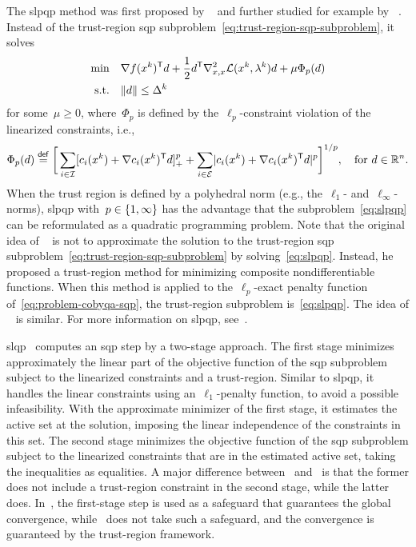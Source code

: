 The \gls{slpqp} method was first proposed by \citeauthor{Fletcher_1982a}~\cite{Fletcher_1982a} and further studied for example by \citeauthor{Yuan_1995}~\cite{Yuan_1995}.
Instead of the trust-region \gls{sqp} subproblem~\cref{eq:trust-region-sqp-subproblem}, it solves
\begin{subequations}
    \label{eq:slpqp}
    \begin{align}
        \min        & \quad \nabla \obj(\iter[k])^{\T} \step + \frac{1}{2} \step^{\T} \nabla_{x, x}^2 \lag(\iter[k], \lm[k]) \step + \mu \Phi_p(d)\\
        \text{s.t.} & \quad \norm{d} \le \rad[k]
    \end{align}
\end{subequations}
for some~$\mu \ge 0$, where~$\Phi_p$ is defined by the~$\ell_p$-constraint violation of the linearized constraints, i.e.,
\begin{equation*}
    \Phi_p(d) \eqdef \bigg[ \sum_{i \in \iub} \posp{\con{i}(\iter[k]) + \nabla \con{i}(\iter[k])^{\T} \step}^p + \sum_{i \in \ieq} \abs{\con{i}(\iter[k]) + \nabla \con{i}(\iter[k])^{\T} \step}^p \bigg]^{1/p}, \quad \text{for~$d \in \R^n$.}
\end{equation*}
When the trust region is defined by a polyhedral norm (e.g., the~$\ell_1$- and~$\ell_{\infty}$-norms), \gls{slpqp} with~$p \in \{1, \infty\}$ has the advantage that the subproblem~\cref{eq:slpqp} can be reformulated as a quadratic programming problem.
Note that the original idea of \citeauthor{Fletcher_1982a}~\cite{Fletcher_1982a} is not to approximate the solution to the trust-region \gls{sqp} subproblem~\cref{eq:trust-region-sqp-subproblem} by solving~\cref{eq:slpqp}.
Instead, he proposed a trust-region method for minimizing composite nondifferentiable functions.
When this method is applied to the~$\ell_p$-exact penalty function of~\cref{eq:problem-cobyqa-sqp}, the trust-region subproblem is~\cref{eq:slpqp}.
The idea of \citeauthor{Yuan_1995}~\cite{Yuan_1995} is similar.
For more information on \gls{slpqp}, see~\cite[\S~8.4.1]{Gould_2021}.

\Gls{slqp}~\cite{Fletcher_Maza_1989,Byrd_Etal_2004} computes an \gls{sqp} step by a two-stage approach.
The first stage minimizes approximately the linear part of the objective function of the \gls{sqp} subproblem subject to the linearized constraints and a trust-region.
Similar to \gls{slpqp}, it handles the linear constraints using an~$\ell_1$-penalty function, to avoid a possible infeasibility.
With the approximate minimizer of the first stage, it estimates the active set at the solution, imposing the linear independence of the constraints in this set.
The second stage minimizes the objective function of the \gls{sqp} subproblem subject to the linearized constraints that are in the estimated active set, taking the inequalities as equalities.
A major difference between~\cite{Fletcher_Maza_1989} and~\cite{Byrd_Etal_2004} is that the former does not include a trust-region constraint in the second stage, while the latter does.
In~\cite{Fletcher_Maza_1989}, the first-stage step is used as a safeguard that guarantees the global convergence, while~\cite{Byrd_Etal_2004} does not take such a safeguard, and the convergence is guaranteed by the trust-region framework.

